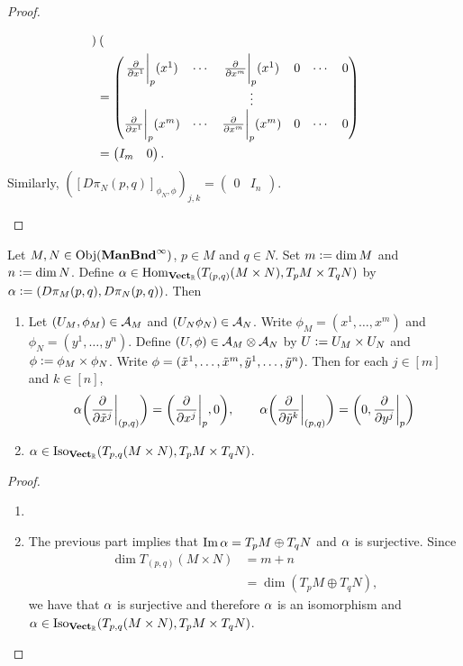 \documentclass{book}
\begin{document}
\begin{proof}
\begin{enumerate}
\begin{align*}
\begin{pmatrix}
				\end{pmatrix} \\
				& = 
				\begin{pmatrix}
					\frac{\partial}{\partial x^1} \bigg|_p (x^1) & \cdots &  \frac{\partial}{\partial x^m} \bigg|_p (x^1) & 0  & \cdots & 0 \\
					&& \vdots \\
					\frac{\partial}{\partial x^1} \bigg|_p (x^m) & \cdots &  \frac{\partial}{\partial x^m} \bigg|_p (x^m) & 0  & \cdots & 0 \\ 
				\end{pmatrix} \\
				& = 
				\begin{pmatrix}
					I_m & 0 
				\end{pmatrix}. 
			\end{align*}
			Similarly, $([D \pi_N (p,q)]_{\phi_N, \phi})_{j,k} = 
			\begin{pmatrix}
				0 & I_n 
			\end{pmatrix}$.
		\end{enumerate}
	\end{proof}

	\begin{ex}
			Let $M,N \in \operatorname{Obj}(\operatorname*{\text{\textbf{ManBnd}}^{\infty}})$, $p \in M$ and $q \in N$. Set $m \vcentcolon= \dim M$ and $n \vcentcolon= \dim N$. Define $\alpha \in \operatorname{Hom}_{\operatorname*{\text{\textbf{Vect}}_{\mathbb{R}}}}(T_{(p, q)} (M \times N), T_p M \times T_q N)$ by $\alpha \vcentcolon= (D \pi_{M}(p, q), D \pi_N(p,q))$. Then
			\begin{enumerate}
				\item  Let $(U_M, \phi_M) \in \mathcal{A}_M$ and $(U_N\phi_N) \in \mathcal{A}_N$. Write $\phi_M = (x^1, \ldots, x^m)$ and $\phi_N = (y^1, \ldots, y^n)$. Define $(U, \phi) \in \mathcal{A}_M \otimes \mathcal{A}_N$ by $U \vcentcolon= U_M \times U_N$ and $\phi \vcentcolon= \phi_M \times \phi_N$. Write $\phi = (\tilde{x}^1, \ldots, \tilde{x}^m, \tilde{y}^1, \ldots, \tilde{y}^n)$. Then for each $j \in [m]$ and $k \in [n]$, 
				$$ \alpha \bigg( \frac{\partial}{\partial \tilde{x}^j} \bigg|_{(p,q)} \bigg) = \bigg( \frac{\partial}{\partial x^j} \bigg|_p , 0\bigg), \quad  \quad \alpha \bigg( \frac{\partial}{\partial \tilde{y}^k} \bigg|_{(p,q)} \bigg) = \bigg( 0, \frac{\partial}{\partial y^j} \bigg|_p \bigg)$$
				\item $\alpha \in \operatorname{Iso}_{\operatorname*{\text{\textbf{Vect}}_{\mathbb{R}}}}(T_{p, q} (M \times N), T_p M \times T_q N)$.
			\end{enumerate}		
	\end{ex}

	\begin{proof}\
		\begin{enumerate}
			\item {}
			\item The previous part implies that $\text{Im} \, \alpha = T_pM \oplus T_qN$ and $\alpha$ is surjective. Since 
			\begin{align*}
				\dim T_{(p, q)} (M \times N) 
				& = m + n \\
				& = \dim( T_pM \oplus T_qN),
			\end{align*}
			we have that $\alpha$ is surjective and therefore $\alpha$ is an isomorphism and $\alpha \in \operatorname{Iso}_{\operatorname*{\text{\textbf{Vect}}_{\mathbb{R}}}}(T_{p, q} (M \times N), T_p M \times T_q N)$. 
		\end{enumerate}
	\end{proof}
\end{document}
